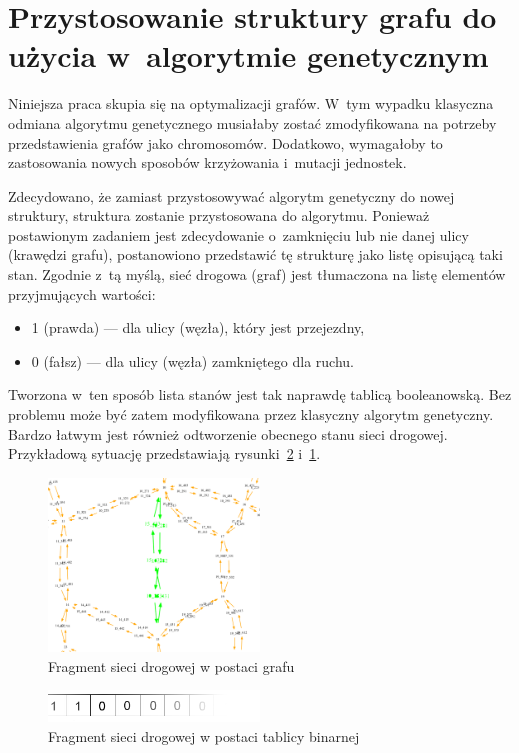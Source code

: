 \documentclass[twoside,12pt]{report}
\begin{document}
\section{Przystosowanie struktury grafu do użycia w~algorytmie genetycznym}

Niniejsza praca skupia się na optymalizacji grafów. W~tym wypadku klasyczna odmiana algorytmu genetycznego musiałaby zostać zmodyfikowana na potrzeby przedstawienia grafów jako chromosomów. Dodatkowo, wymagałoby to zastosowania nowych sposobów krzyżowania i~mutacji jednostek. 

Zdecydowano, że zamiast przystosowywać algorytm genetyczny do nowej struktury, struktura zostanie przystosowana do algorytmu. Ponieważ postawionym zadaniem jest zdecydowanie o~zamknięciu lub nie danej ulicy (krawędzi grafu), postanowiono przedstawić tę strukturę jako listę opisującą taki stan. Zgodnie z~tą myślą, sieć drogowa (graf) jest tłumaczona na listę elementów przyjmujących wartości:

\begin{itemize}
\item 1 (prawda) --- dla ulicy (węzła), który jest przejezdny,
\item 0 (fałsz) --- dla ulicy (węzła) zamkniętego dla ruchu.
\end{itemize}

Tworzona w~ten sposób lista stanów jest tak naprawdę tablicą booleanowską. Bez problemu może być zatem modyfikowana przez klasyczny algorytm genetyczny. Bardzo łatwym jest również odtworzenie obecnego stanu sieci drogowej. Przykładową sytuację przedstawiają rysunki~\ref{fig:bool_network_example} i~\ref{fig:graph_network_example}.

\begin{figure}[htbp]
	\centering
	\includegraphics[width=0.5\textwidth]{img/bool-efect}
	\caption{Fragment sieci drogowej w postaci grafu}
	\label{fig:graph_network_example}
\end{figure}
\begin{figure}[htbp]
	\centering
	\includegraphics[width=0.5\textwidth]{img/bool}
	\caption{Fragment sieci drogowej w postaci tablicy binarnej }
	\label{fig:bool_network_example}
\end{figure}
\end{document}
